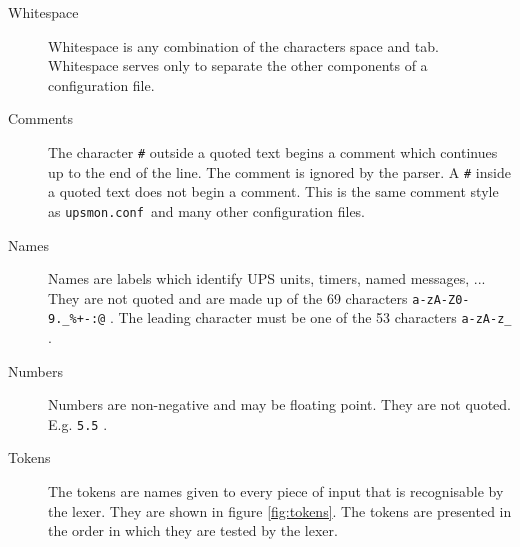 \documentclass[12pt]{article}
\newcommand{\upsmonconf}{\textcolor{MONCOLOUR}{\texttt{upsmon.conf}}}
\begin{document}
\begin{description}

\item[Whitespace]

Whitespace is any combination of the characters space and tab.  Whitespace
serves only to separate the other components of a configuration file.

\item[Comments]

The character \texttt{\#} outside a quoted text begins a comment which
continues up to the end of the line.  The comment is ignored by the parser.  A
\texttt{\#} inside a quoted text does not begin a comment.  This is the same
comment style as \upsmonconf\ and many other configuration files.

\item[Names]

Names are labels which identify UPS units, timers, named messages, ...  They
are not quoted and are made up of the 69 characters
\texttt{a-zA-Z0-9.\_\%+-:@} .  The leading character must be one of the 53
characters \texttt{a-zA-z\_} .

\item[Numbers]

Numbers are non-negative and may be floating point.  They are not quoted.
E.g. \texttt{5.5} .

\item[Tokens]

The tokens are names given to every piece of input that is recognisable by the
lexer.  They are shown in figure \ref{fig:tokens}.  The tokens are presented
in the order in which they are tested by the lexer.


\end{description}
\end{document}
